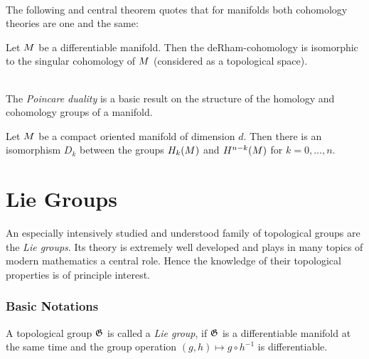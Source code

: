 \documentclass[11pt,twoside]{article}
\begin{document}
\paragraph{}
The following and central theorem quotes
that for manifolds both cohomology theories are one and the same:

\begin{theorem}
Let ${M}$ be a differentiable manifold.
Then the deRham-cohomology is isomorphic to the singular cohomology
of ${M}$ (considered as a topological space).
\end{theorem}

\paragraph{}
The \textit{Poincare duality} is a basic result on
the structure of the homology and cohomology groups of a manifold.

\begin{theorem}
Let ${M}$ be a compact oriented manifold of dimension $d$.
Then there is an isomorphism $D_k$ between the groups $H_k({M})$
and $H^{n-k}({M})$ for $k=0,\ldots,n$.
\end{theorem}

\newpage
\thispagestyle{empty}
\part{Lie Groups}                                                              %
An especially intensively studied and understood family of topological groups
are the \textit{Lie groups}.
Its theory is extremely well developed and plays
in many topics of modern mathematics a central role.
Hence the knowledge of their topological properties is of principle interest.

\section{Basic Notations}
\begin{definition}
A topological group $\mathfrak{G}$ is called a \textit{Lie group},
if $\mathfrak{G}$ is a differentiable manifold at the same time 
and the group operation $(g,h) \mapsto g \circ h^{-1}$ is differentiable.
\end{definition}
\end{document}
